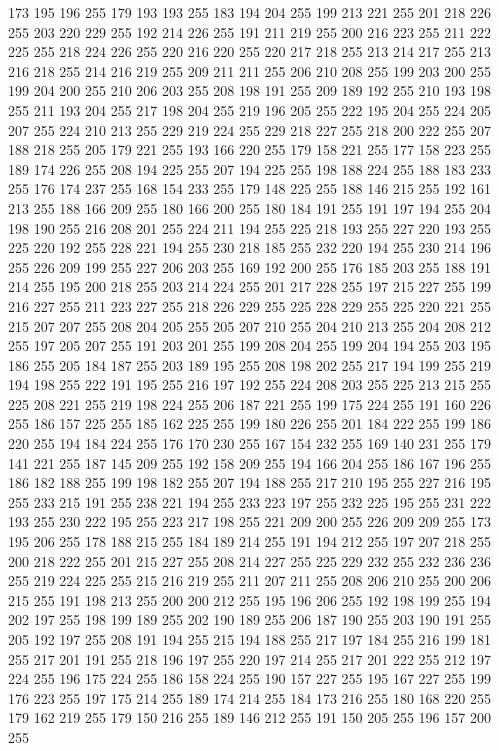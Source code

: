 173 195 196 255 179 193 193 255 183 194 204 255 199 213 221 255 201 218 226 255 203 220 229 255 192 214 226 255 191 211 219 255 200 216 223 255 211 222 225 255 218 224 226 255 220 216 220 255 220 217 218 255 213 214 217 255 213 216 218 255 214 216 219 255
209 211 211 255 206 210 208 255 199 203 200 255 199 204 200 255 210 206 203 255 208 198 191 255 209 189 192 255 210 193 198 255 211 193 204 255 217 198 204 255 219 196 205 255 222 195 204 255 224 205 207 255 224 210 213 255 229 219 224 255 229 218 227 255
218 200 222 255 207 188 218 255 205 179 221 255 193 166 220 255 179 158 221 255 177 158 223 255 189 174 226 255 208 194 225 255 207 194 225 255 198 188 224 255 188 183 233 255 176 174 237 255 168 154 233 255 179 148 225 255 188 146 215 255 192 161 213 255
188 166 209 255 180 166 200 255 180 184 191 255 191 197 194 255 204 198 190 255 216 208 201 255 224 211 194 255 225 218 193 255 227 220 193 255 225 220 192 255 228 221 194 255 230 218 185 255 232 220 194 255 230 214 196 255 226 209 199 255 227 206 203 255
169 192 200 255 176 185 203 255 188 191 214 255 195 200 218 255 203 214 224 255 201 217 228 255 197 215 227 255 199 216 227 255 211 223 227 255 218 226 229 255 225 228 229 255 225 220 221 255 215 207 207 255 208 204 205 255 205 207 210 255 204 210 213 255
204 208 212 255 197 205 207 255 191 203 201 255 199 208 204 255 199 204 194 255 203 195 186 255 205 184 187 255 203 189 195 255 208 198 202 255 217 194 199 255 219 194 198 255 222 191 195 255 216 197 192 255 224 208 203 255 225 213 215 255 225 208 221 255
219 198 224 255 206 187 221 255 199 175 224 255 191 160 226 255 186 157 225 255 185 162 225 255 199 180 226 255 201 184 222 255 199 186 220 255 194 184 224 255 176 170 230 255 167 154 232 255 169 140 231 255 179 141 221 255 187 145 209 255 192 158 209 255
194 166 204 255 186 167 196 255 186 182 188 255 199 198 182 255 207 194 188 255 217 210 195 255 227 216 195 255 233 215 191 255 238 221 194 255 233 223 197 255 232 225 195 255 231 222 193 255 230 222 195 255 223 217 198 255 221 209 200 255 226 209 209 255
173 195 206 255 178 188 215 255 184 189 214 255 191 194 212 255 197 207 218 255 200 218 222 255 201 215 227 255 208 214 227 255 225 229 232 255 232 236 236 255 219 224 225 255 215 216 219 255 211 207 211 255 208 206 210 255 200 206 215 255 191 198 213 255
200 200 212 255 195 196 206 255 192 198 199 255 194 202 197 255 198 199 189 255 202 190 189 255 206 187 190 255 203 190 191 255 205 192 197 255 208 191 194 255 215 194 188 255 217 197 184 255 216 199 181 255 217 201 191 255 218 196 197 255 220 197 214 255
217 201 222 255 212 197 224 255 196 175 224 255 186 158 224 255 190 157 227 255 195 167 227 255 199 176 223 255 197 175 214 255 189 174 214 255 184 173 216 255 180 168 220 255 179 162 219 255 179 150 216 255 189 146 212 255 191 150 205 255 196 157 200 255
